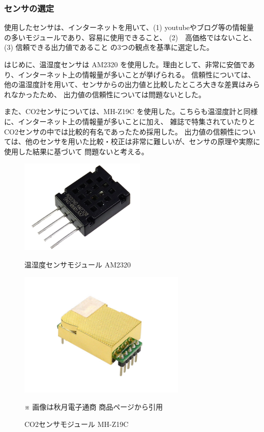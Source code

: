 \documentclass[a4paper]{jsarticle}
\begin{document}
\subsubsection{センサの選定}
使用したセンサは、インターネットを用いて、(1) youtubeやブログ等の情報量の多いモジュールであり、容易に使用できること、 
(2)　高価格ではないこと、(3) 信頼できる出力値であること の3つの観点を基準に選定した。\par
はじめに、温湿度センサは AM2320 を使用した。理由として、非常に安価であり、インターネット上の情報量が多いことが挙げられる。
信頼性については、他の温湿度計を用いて、センサからの出力値と比較したところ大きな差異はみられなかったため、
出力値の信頼性については問題ないとした。\par
また、CO2センサについては、MH-Z19C を使用した。こちらも温湿度計と同様に、インターネット上の情報量が多いことに加え、
雑誌で特集されていたりとCO2センサの中では比較的有名であったため採用した。
出力値の信頼性については、他のセンサを用いた比較・校正は非常に難しいが、センサの原理や実際に使用した結果に基づいて
問題ないと考える。
\begin{figure}[htbp]
    \begin{minipage}{0.5\hsize}
        \begin{center}
            \includegraphics[width=60mm]{images/AM2320.jpg}
        \end{center}
        \caption{温湿度センサモジュール AM2320}
        \label{fig:one}
    \end{minipage}
    \begin{minipage}{0.5\hsize}
        \begin{center}
            \includegraphics[width=80mm]{images/MH-Z19.jpg}
        \end{center}
        \caption{CO2センサモジュール MH-Z19C}
        \label{fig:two}
    \end{minipage}
    \begin{center}
        ※ 画像は秋月電子通商 商品ページから引用
    \end{center}
\end{figure}
\end{document}
